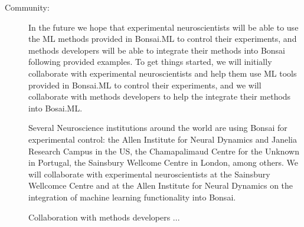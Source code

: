 \begin{description}
    \item[Community:] In the future we hope that experimental neuroscientists
        will be able to use the ML methods provided in Bonsai.ML to control
        their experiments, and methods developers will be able to integrate
        their methods into Bonsai following provided examples. To get things
        started, we will initially collaborate with experimental neuroscientists
        and help them use ML tools provided in Bonsai.ML to control their
        experiments, and we will collaborate with methods developers to help
        the integrate their methods into Bosai.ML.

        Several Neuroscience institutions around the world are using Bonsai for
        experimental control: the Allen Institute for Neural Dynamics and
        Janelia Research Campus in the US, the Chamapalimaud Centre for the
        Unknown in Portugal, the Sainsbury Wellcome  Centre in London, among
        others. We will collaborate with experimental neuroscientists at the
        Sainsbury Wellcomce Centre and at the Allen Institute for Neural
        Dynamics on the integration of machine learning functionality into
        Bonsai.

        Collaboration with methods developers ...

\end{description}

